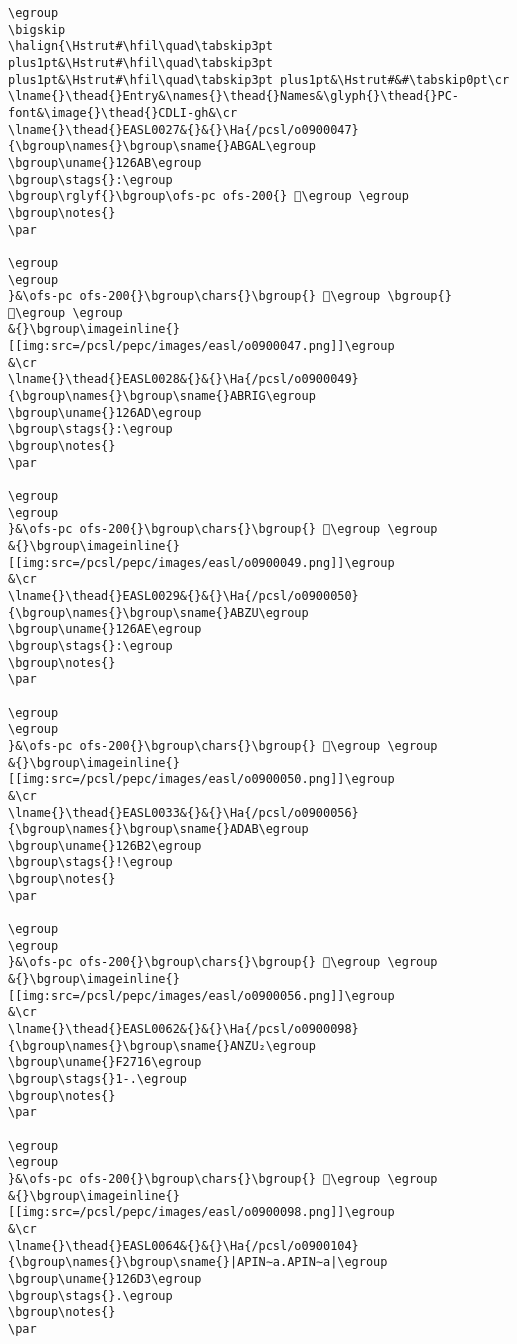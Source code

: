 \begin{verbatim}
\egroup
\bigskip
\halign{\Hstrut#\hfil\quad\tabskip3pt plus1pt&\Hstrut#\hfil\quad\tabskip3pt plus1pt&\Hstrut#\hfil\quad\tabskip3pt plus1pt&\Hstrut#&#\tabskip0pt\cr
\lname{}\thead{}Entry&\names{}\thead{}Names&\glyph{}\thead{}PC-font&\image{}\thead{}CDLI-gh&\cr
\lname{}\thead{}EASL0027&{}&{}\Ha{/pcsl/o0900047}{\bgroup\names{}\bgroup\sname{}ABGAL\egroup
\bgroup\uname{}126AB\egroup
\bgroup\stags{}:\egroup
\bgroup\rglyf{}\bgroup\ofs-pc ofs-200{} 𒚫\egroup \egroup
\bgroup\notes{}
\par 

\egroup
\egroup
}&\ofs-pc ofs-200{}\bgroup\chars{}\bgroup{} 𒚫\egroup \bgroup{} 𒚬\egroup \egroup
&{}\bgroup\imageinline{}[[img:src=/pcsl/pepc/images/easl/o0900047.png]]\egroup
&\cr
\lname{}\thead{}EASL0028&{}&{}\Ha{/pcsl/o0900049}{\bgroup\names{}\bgroup\sname{}ABRIG\egroup
\bgroup\uname{}126AD\egroup
\bgroup\stags{}:\egroup
\bgroup\notes{}
\par 

\egroup
\egroup
}&\ofs-pc ofs-200{}\bgroup\chars{}\bgroup{} 𒚭\egroup \egroup
&{}\bgroup\imageinline{}[[img:src=/pcsl/pepc/images/easl/o0900049.png]]\egroup
&\cr
\lname{}\thead{}EASL0029&{}&{}\Ha{/pcsl/o0900050}{\bgroup\names{}\bgroup\sname{}ABZU\egroup
\bgroup\uname{}126AE\egroup
\bgroup\stags{}:\egroup
\bgroup\notes{}
\par 

\egroup
\egroup
}&\ofs-pc ofs-200{}\bgroup\chars{}\bgroup{} 𒚮\egroup \egroup
&{}\bgroup\imageinline{}[[img:src=/pcsl/pepc/images/easl/o0900050.png]]\egroup
&\cr
\lname{}\thead{}EASL0033&{}&{}\Ha{/pcsl/o0900056}{\bgroup\names{}\bgroup\sname{}ADAB\egroup
\bgroup\uname{}126B2\egroup
\bgroup\stags{}!\egroup
\bgroup\notes{}
\par 

\egroup
\egroup
}&\ofs-pc ofs-200{}\bgroup\chars{}\bgroup{} 𒚲\egroup \egroup
&{}\bgroup\imageinline{}[[img:src=/pcsl/pepc/images/easl/o0900056.png]]\egroup
&\cr
\lname{}\thead{}EASL0062&{}&{}\Ha{/pcsl/o0900098}{\bgroup\names{}\bgroup\sname{}ANZU₂\egroup
\bgroup\uname{}F2716\egroup
\bgroup\stags{}1-.\egroup
\bgroup\notes{}
\par 

\egroup
\egroup
}&\ofs-pc ofs-200{}\bgroup\chars{}\bgroup{} 󲜖\egroup \egroup
&{}\bgroup\imageinline{}[[img:src=/pcsl/pepc/images/easl/o0900098.png]]\egroup
&\cr
\lname{}\thead{}EASL0064&{}&{}\Ha{/pcsl/o0900104}{\bgroup\names{}\bgroup\sname{}|APIN∼a.APIN∼a|\egroup
\bgroup\uname{}126D3\egroup
\bgroup\stags{}.\egroup
\bgroup\notes{}
\par 


\end{verbatim}

